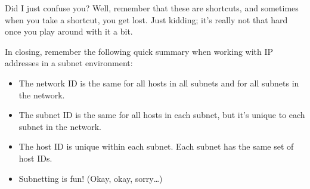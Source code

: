 Did I just confuse you? Well, remember that these are shortcuts, and
sometimes when you take a shortcut, you get lost. Just kidding; it's
really not that hard once you play around with it a bit.

In closing, remember the following quick summary when working with IP addresses in a subnet environment:

\begin{itemize}
   \item
      The network ID is the same for all hosts in all subnets and for all subnets in the network.
   \item
      The subnet ID is the same for all hosts in each subnet, but it's unique to each subnet in the network.
   \item
      The host ID is unique within each subnet.
      Each subnet has the same set of host IDs.
   \item
      Subnetting is fun! (Okay, okay, sorry\ldots)
\end{itemize}

